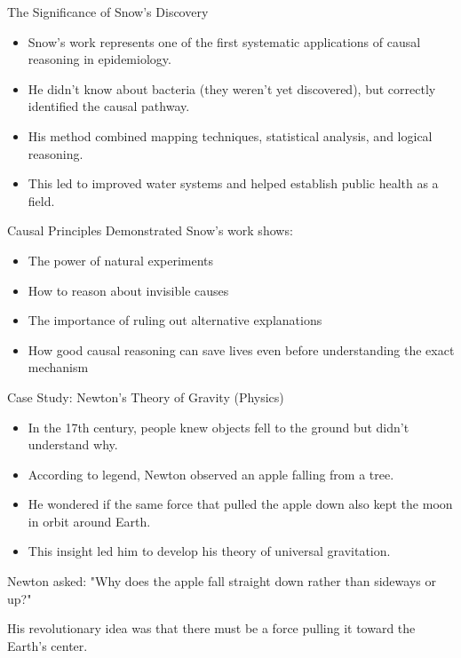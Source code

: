 \documentclass{beamer}
\begin{document}
\begin{frame}{The Significance of Snow's Discovery}
    \begin{itemize}
        \item Snow's work represents one of the first systematic applications of causal reasoning in epidemiology.
        \item He didn't know about bacteria (they weren't yet discovered), but correctly identified the causal pathway.
        \item His method combined mapping techniques, statistical analysis, and logical reasoning.
        \item This led to improved water systems and helped establish public health as a field.
    \end{itemize}
    
    \begin{alertblock}{Causal Principles Demonstrated}
        Snow's work shows:
        \begin{itemize}
            \item The power of natural experiments
            \item How to reason about invisible causes
            \item The importance of ruling out alternative explanations
            \item How good causal reasoning can save lives even before understanding the exact mechanism
        \end{itemize}
    \end{alertblock}
\end{frame}

\begin{frame}{Case Study: Newton's Theory of Gravity (Physics)}
    \begin{itemize}
        \item In the 17th century, people knew objects fell to the ground but didn't understand why.
        \item According to legend, Newton observed an apple falling from a tree.
        \item He wondered if the same force that pulled the apple down also kept the moon in orbit around Earth.
        \item This insight led him to develop his theory of universal gravitation.
    \end{itemize}
    
    \begin{example}
        Newton asked: "Why does the apple fall straight down rather than sideways or up?" 
        
        His revolutionary idea was that there must be a force pulling it toward the Earth's center.
    \end{example}
\end{frame}
\end{document}
